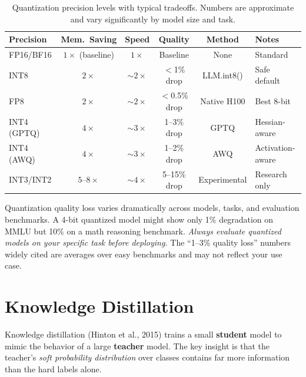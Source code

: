 \begin{table}[H]
\centering
\small
\begin{tabularx}{\textwidth}{@{}l c c c c X@{}}
\toprule
\textbf{Precision} & \textbf{Mem.\ Saving} & \textbf{Speed} & \textbf{Quality} & \textbf{Method} & \textbf{Notes} \\
\midrule
FP16/BF16 & $1\times$ (baseline) & $1\times$    & Baseline    & None  & Standard \\
INT8      & $2\times$            & $\sim$$2\times$ & $<$1\% drop & LLM.int8()  & Safe default \\
FP8       & $2\times$            & $\sim$$2\times$ & $<$0.5\% drop & Native H100 & Best 8-bit \\
INT4 (GPTQ) & $4\times$         & $\sim$$3\times$ & 1--3\% drop & GPTQ  & Hessian-aware \\
INT4 (AWQ) & $4\times$          & $\sim$$3\times$ & 1--2\% drop & AWQ   & Activation-aware \\
INT3/INT2 & $5$--$8\times$      & $\sim$$4\times$ & 5--15\% drop & Experimental & Research only \\
\bottomrule
\end{tabularx}
\caption{Quantization precision levels with typical tradeoffs.  Numbers are approximate
and vary significantly by model size and task.}
\label{tab:quantization_tradeoffs}
\end{table}

\begin{warningbox}
Quantization quality loss varies dramatically across models, tasks, and evaluation
benchmarks.  A 4-bit quantized model might show only 1\% degradation on MMLU but 10\%
on a math reasoning benchmark.  \emph{Always evaluate quantized models on your specific
task before deploying.}  The ``1--3\% quality loss'' numbers widely cited are averages
over easy benchmarks and may not reflect your use case.
\end{warningbox}


\section{Knowledge Distillation}
\label{sec:distillation}

Knowledge distillation (Hinton et al., 2015) trains a small \textbf{student} model to
mimic the behavior of a large \textbf{teacher} model.  The key insight is that the
teacher's \emph{soft probability distribution} over classes contains far more information
than the hard labels alone.

